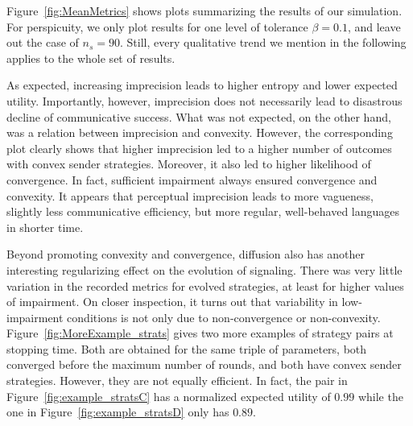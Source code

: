 \documentclass[fleqn,reqno,10pt]{article}
\begin{document}
Figure~\ref{fig:MeanMetrics} shows plots summarizing the results of
our simulation. For perspicuity, we only plot results for one level of
tolerance $\beta = 0.1$, and leave out the case of $n_s = 90$. Still,
every qualitative trend we mention in the following applies to the
whole set of results.

As expected, increasing imprecision leads to higher entropy and lower
expected utility. Importantly, however, imprecision does not
necessarily lead to disastrous decline of communicative success. What
was not expected, on the other hand, was a relation between
imprecision and convexity. However, the corresponding plot clearly
shows that higher imprecision led to a higher number of outcomes with
convex sender strategies. Moreover, it also led to higher likelihood
of convergence. In fact, sufficient impairment always ensured
convergence and convexity. It appears that perceptual imprecision
leads to more vagueness, slightly less communicative efficiency, but
more regular, well-behaved languages in shorter time.

Beyond promoting convexity and convergence, diffusion also has another interesting
regularizing effect on the evolution of signaling. There was very
little variation in the recorded metrics for evolved strategies, at
least for higher values of impairment. On closer inspection, it turns
out that variability in low-impairment conditions is not only due to
non-convergence or non-convexity. Figure~\ref{fig:MoreExample_strats}
gives two more examples of strategy pairs at stopping time. Both are
obtained for the same triple of parameters, both converged before the
maximum number of rounds, and both have
convex sender strategies. However, they are not equally efficient. In
fact, the pair in Figure~\ref{fig:example_stratsC} has a normalized
expected utility of $0.99$ while the one in
Figure~\ref{fig:example_stratsD} only has $0.89$.
\end{document}
